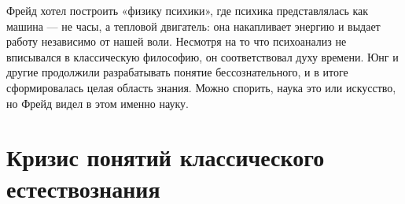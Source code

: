 Фрейд хотел построить «физику психики», где психика представлялась как машина --- не часы, а тепловой двигатель: она накапливает энергию и выдает работу независимо от нашей воли. Несмотря на то что психоанализ не вписывался в классическую философию, он соответствовал духу времени. Юнг и другие продолжили разрабатывать понятие бессознательного, и в итоге сформировалась целая область знания. Можно спорить, наука это или искусство, но Фрейд видел в этом именно науку.

\section{Кризис понятий классического естествознания}
